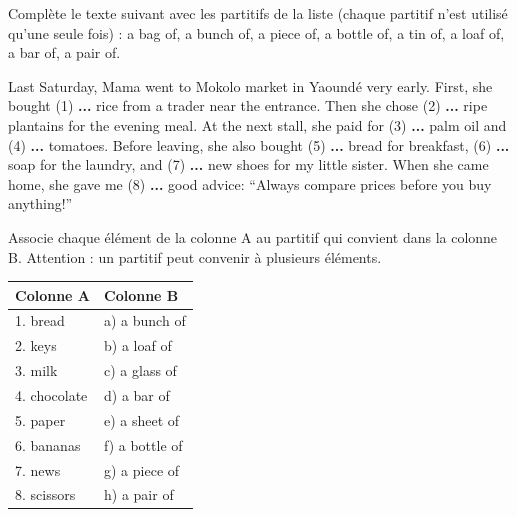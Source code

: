 \documentclass[11pt]{article}
\newcommand{\cle}[1]{{\popxbold\color{popdark}#1}}
\newcounter{popsec}
\newcounter{popsub}
\newcommand{\courssub}[1]{%
  \stepcounter{popsub}%
  \par\vspace{9pt}\noindent{\popxbold\fontsize{11.5}{13}\selectfont\color{popink}{\color{poporange}\thepopsec.\thepopsub}\hspace{6pt}#1}\par\nopagebreak\vspace{4pt}
}
\begin{document}
\begin{exercice}
Complète le texte suivant avec les partitifs de la liste (chaque partitif n'est utilisé qu'une seule fois) : \cle{a bag of}, \cle{a bunch of}, \cle{a piece of}, \cle{a bottle of}, \cle{a tin of}, \cle{a loaf of}, \cle{a bar of}, \cle{a pair of}.

\begin{textebox}
Last Saturday, Mama went to Mokolo market in Yaoundé very early. First, she bought (1) \textbf{...} rice from a trader near the entrance. Then she chose (2) \textbf{...} ripe plantains for the evening meal. At the next stall, she paid for (3) \textbf{...} palm oil and (4) \textbf{...} tomatoes. Before leaving, she also bought (5) \textbf{...} bread for breakfast, (6) \textbf{...} soap for the laundry, and (7) \textbf{...} new shoes for my little sister. When she came home, she gave me (8) \textbf{...} good advice: “Always compare prices before you buy anything!”
\end{textebox}
\end{exercice}

\begin{exercice}
Associe chaque élément de la colonne A au partitif qui convient dans la colonne B. Attention : un partitif peut convenir à plusieurs éléments.

\begin{center}
\begin{tabularx}{\linewidth}{|X|X|}
\hline
\rowcolor{popblueL} \textbf{Colonne A} & \textbf{Colonne B} \\
\hline
1. bread & a) a bunch of \\
\hline
2. keys & b) a loaf of \\
\hline
3. milk & c) a glass of \\
\hline
4. chocolate & d) a bar of \\
\hline
5. paper & e) a sheet of \\
\hline
6. bananas & f) a bottle of \\
\hline
7. news & g) a piece of \\
\hline
8. scissors & h) a pair of \\
\hline
\end{tabularx}
\end{center}
\end{exercice}

\courssub{Je me prépare au Bac}
\end{document}
